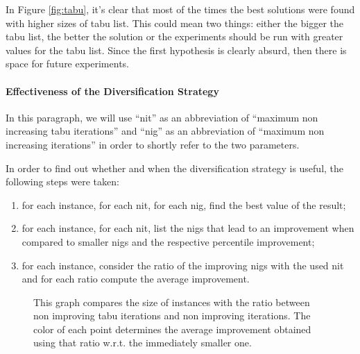 \documentclass{article}
\begin{document}
In Figure \ref{fig:tabu}, it's clear that most of the times the best solutions were found with higher sizes of tabu list.
This could mean two things: either the bigger the tabu list, the better the solution or the experiments should be run with greater values for the tabu list.
Since the first hypothesis is clearly absurd, then there is space for future experiments.

\paragraph{Effectiveness of the Diversification Strategy}
In this paragraph, we will use ``nit'' as an abbreviation of ``maximum non increasing tabu iterations'' and ``nig'' as an abbreviation of ``maximum non increasing iterations'' in order to shortly refer to the two parameters.

In order to find out whether and when the diversification strategy is useful, the following steps were taken:
\begin{enumerate}
    \item for each instance, for each nit, for each nig, find the best value of the result;
    \item for each instance, for each nit, list the nigs that lead to an improvement when compared to smaller nigs and the respective percentile improvement;
    \item for each instance, consider the ratio of the improving nigs with the used nit and for each ratio compute the average improvement.
\end{enumerate}

\begin{figure}
    \centering
    \caption{
        This graph compares the size of instances with the ratio between non improving tabu iterations and non improving iterations.
        The color of each point determines the average improvement obtained using that ratio w.r.t. the immediately smaller one.
    }
    \label{fig:div}
\end{figure}
\end{document}
